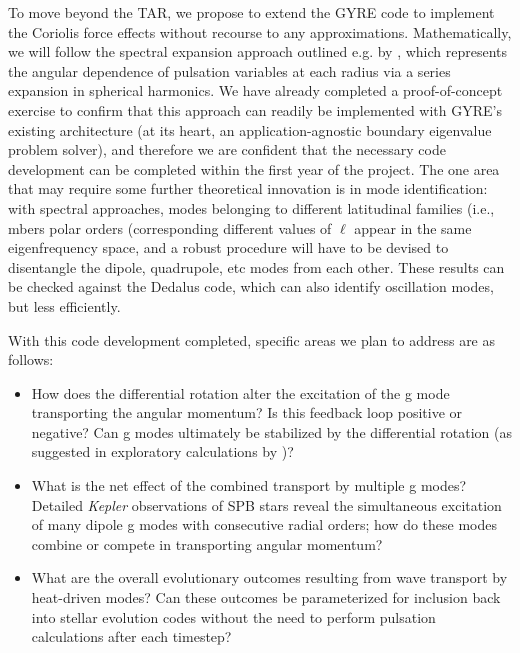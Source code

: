To move beyond the TAR, we propose to extend the GYRE code to implement the Coriolis force effects without recourse to any approximations. Mathematically, we will follow the spectral expansion approach outlined e.g. by \citet{Lee:2001}, which represents the angular dependence of pulsation variables at each radius via a series expansion in spherical harmonics. We have already completed a proof-of-concept exercise to confirm that this approach can readily be implemented with GYRE's existing architecture (at its heart, an application-agnostic boundary eigenvalue problem solver), and therefore we are confident that the necessary code development can be completed within the first year of the project. The one area that may require some further theoretical innovation is in mode identification: with spectral approaches, modes belonging to different latitudinal families (i.e., mbers polar orders (corresponding different values of $\ell$ appear in the same eigenfrequency space, and a robust procedure will have to be devised to disentangle the dipole, quadrupole, etc modes from each other. These results can be checked against the Dedalus code, which can also identify oscillation modes, but less efficiently.

With this code development completed, specific areas we plan to address are as follows:
\begin{itemize}
\item How does the differential rotation alter the excitation of the g mode transporting the angular momentum? Is this feedback loop positive or negative? Can g modes ultimately be stabilized by the differential rotation (as suggested in exploratory calculations by \cite{Townsend:2008})?
\item What is the net effect of the combined transport by multiple g modes? Detailed \emph{Kepler} observations of SPB stars \citep[e.g., KIC 10526294][]{Papics:2014} reveal the simultaneous excitation of many dipole g modes with consecutive radial orders; how do these modes combine or compete in transporting angular momentum?
\item What are the overall evolutionary outcomes resulting from wave transport by heat-driven modes? Can these outcomes be parameterized for inclusion back into stellar evolution codes without the need to perform pulsation calculations after each timestep?
\end{itemize}
